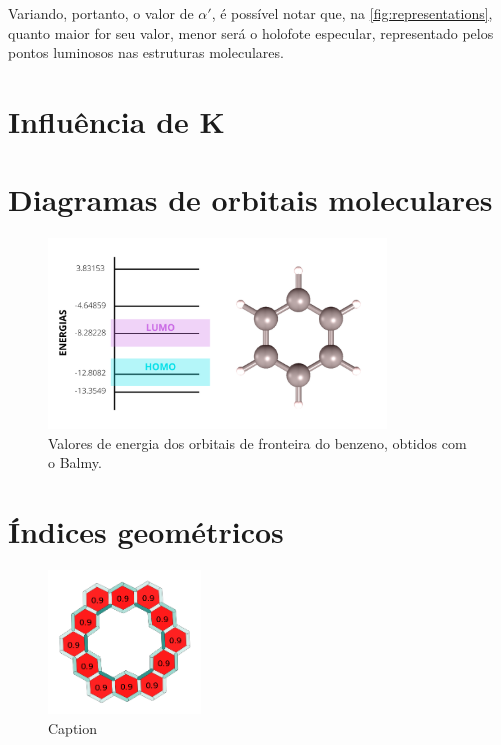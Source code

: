 Variando, portanto, o valor de $\alpha'$, é possível notar que, na \autoref{fig:representations}, quanto maior for seu valor, menor será o holofote especular, representado pelos pontos luminosos nas estruturas moleculares.

\section{Influência de K}



\section{Diagramas de orbitais moleculares}

\begin{figure}[htb]
	\caption{\label{fig:4} Valores de energia dos orbitais de fronteira do benzeno, obtidos com o Balmy.}
	\begin{center}
		\includegraphics[width=0.80\textwidth]{images/MOS1.png}
	\end{center}
\end{figure}

\section{Índices geométricos}

\begin{figure}[htb!]
    \centering
    \includegraphics[width=0.36\textwidth]{images/kekulene.png}
    \caption{Caption}
    \label{fig:my_label}
\end{figure}

